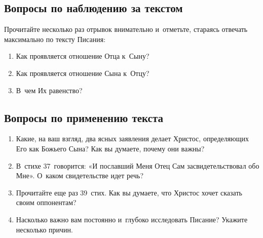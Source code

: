 \documentclass[a4paper,12pt]{article}
\begin{document}
\subsection*{Вопросы по наблюдению за текстом}
Прочитайте несколько раз отрывок внимательно и~отметьте, стараясь отвечать максимально по тексту Писания: 

\begin{enumerate}
    
    \item Как проявляется отношение Отца к~Сыну? 
    
    \myline
    
    \myline
    \item Как проявляется отношение Сына к~Отцу? 
    
    \myline
    
    \myline
    \item В~чем Их равенство? 
    
    \myline
    
    \myline
\end{enumerate}

\subsection*{Вопросы по применению текста} 
\begin{enumerate}
    \item Какие, на ваш взгляд, два ясных заявления делает Христос, определяющих Его как Божьего Сына? Как вы думаете, почему они важны?
    
    \myline
    
    \myline
    \item В~стихе 37~говорится: «И пославший Меня Отец Сам засвидетельствовал обо Мне». О~каком свидетельстве идет речь? 
    
    \myline
    
    \myline
    \item Прочитайте еще раз 39~стих. Как вы думаете, что Христос хочет сказать своим оппонентам? 
    
    \myline
    
    \myline
    \item Насколько важно вам постоянно и~глубоко исследовать Писание? Укажите несколько причин.
    
    \myline
    
    \myline
\end{enumerate}

\end{document}

